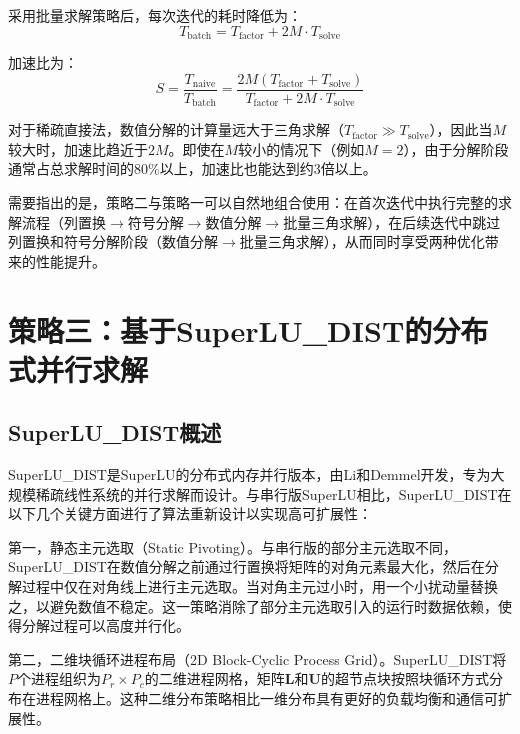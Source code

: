 采用批量求解策略后，每次迭代的耗时降低为：
\begin{equation}
  T_{\mathrm{batch}} = T_{\mathrm{factor}} + 2M \cdot T_{\mathrm{solve}}
  \label{eq:batch_time}
\end{equation}

加速比为：
\begin{equation}
  S = \frac{T_{\mathrm{naive}}}{T_{\mathrm{batch}}} = \frac{2M(T_{\mathrm{factor}} + T_{\mathrm{solve}})}{T_{\mathrm{factor}} + 2M \cdot T_{\mathrm{solve}}}
  \label{eq:batch_speedup}
\end{equation}

对于稀疏直接法，数值分解的计算量远大于三角求解（$T_{\mathrm{factor}} \gg T_{\mathrm{solve}}$），因此当$M$较大时，加速比趋近于$2M$。即使在$M$较小的情况下（例如$M = 2$），由于分解阶段通常占总求解时间的80\%以上，加速比也能达到约3倍以上。

需要指出的是，策略二与策略一可以自然地组合使用：在首次迭代中执行完整的求解流程（列置换$\rightarrow$符号分解$\rightarrow$数值分解$\rightarrow$批量三角求解），在后续迭代中跳过列置换和符号分解阶段（数值分解$\rightarrow$批量三角求解），从而同时享受两种优化带来的性能提升。

\section{策略三：基于SuperLU\_DIST的分布式并行求解}

\subsection{SuperLU\_DIST概述}

SuperLU\_DIST是SuperLU的分布式内存并行版本，由Li和Demmel开发\cite{Li2003}，专为大规模稀疏线性系统的并行求解而设计。与串行版SuperLU相比，SuperLU\_DIST在以下几个关键方面进行了算法重新设计以实现高可扩展性\cite{Liu2023}：

第一，静态主元选取（Static Pivoting）。与串行版的部分主元选取不同，SuperLU\_DIST在数值分解之前通过行置换将矩阵的对角元素最大化，然后在分解过程中仅在对角线上进行主元选取。当对角主元过小时，用一个小扰动量替换之，以避免数值不稳定。这一策略消除了部分主元选取引入的运行时数据依赖，使得分解过程可以高度并行化。

第二，二维块循环进程布局（2D Block-Cyclic Process Grid）。SuperLU\_DIST将$P$个进程组织为$P_r \times P_c$的二维进程网格，矩阵$\boldsymbol{L}$和$\boldsymbol{U}$的超节点块按照块循环方式分布在进程网格上。这种二维分布策略相比一维分布具有更好的负载均衡和通信可扩展性。

